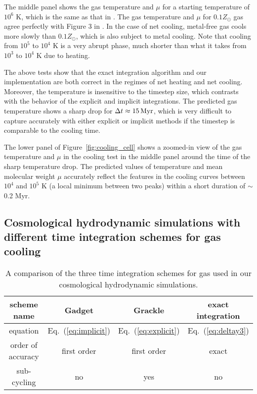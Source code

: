 \documentclass[a4paper,fleqn,usenatbib,useAMS, twocolumn]{mnras}
\begin{document}
The middle panel shows the gas temperature and $\mu$ for a starting temperature of
$10^6$ K, which is the same as that in \cite{Smith2016}. The gas temperature and 
$\mu$ for $0.1Z_{\odot}$ gas agree perfectly with Figure 3 in \cite{Smith2016}. In the case of 
net cooling, metal-free gas cools more slowly than 
$0.1Z_{\odot}$, which is also subject to metal cooling. 
Note that cooling from $10^5$ to $10^4$ K is a very abrupt phase, 
much shorter than what it takes from $10^3$ to $10^4$ K due to heating.

The above tests show that the exact integration algorithm and
our implementation are both correct in the regimes of net heating and
net cooling. Moreover, the temperature is insensitive to the timestep
size, which contrasts with the behavior of the explicit and implicit
integrations.  The predicted gas temperature shows a sharp drop for
$\Delta t \approx 15\, \rm{Myr} $, which is very difficult to capture
accurately with either explicit or implicit methods if the timestep is
comparable to the cooling time.

The lower panel of Figure~\ref{fig:cooling_cell} shows a zoomed-in
view of the gas temperature and $\mu$ in the cooling test in the
middle panel around the time of the sharp temperature drop.  The
predicted values of temperature and mean molecular weight $\mu$
accurately reflect the features in the cooling curves between
$10^4$ and $10^5$ K (a local minimum between two peaks) within a short
duration of $\sim$0.2 Myr.

\subsection{Cosmological hydrodynamic simulations with different time integration schemes for gas cooling}


\begin{table}
\caption{A comparison of the three time integration schemes for gas used in our cosmological hydrodynamic 
simulations.}
\begin{center}
\begin{tabular}{c|c|c|c}
\toprule
scheme   name         & {\sc Gadget}  & {\sc Grackle} & exact integration      \\\hline
equation                    & Eq.~(\ref{eq:implicit})    & Eq.~(\ref{eq:explicit})  & Eq.~(\ref{eq:deltay3}) \\\hline
order of accuracy      &   first order     &  first order     &       exact                   \\\hline    
sub-cycling                &    no                & yes               & no                             \\       
\bottomrule
\end{tabular}
\end{center}
\label{table:integration_comparison}
\end{table}
\end{document}
